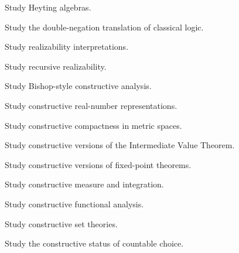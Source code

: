 \begin{exercise}[4]
Study Heyting algebras.
\end{exercise}

\begin{exercise}[4]
Study the double-negation translation of classical logic.
\end{exercise}

\begin{exercise}[4]
Study realizability interpretations.
\end{exercise}

\begin{exercise}[4]
Study recursive realizability.
\end{exercise}

\begin{exercise}[4]
Study Bishop-style constructive analysis.
\end{exercise}

\begin{exercise}[4]
Study constructive real-number representations.
\end{exercise}

\begin{exercise}[4]
Study constructive compactness in metric spaces.
\end{exercise}

\begin{exercise}[4]
Study constructive versions of the Intermediate Value Theorem.
\end{exercise}

\begin{exercise}[4]
Study constructive versions of fixed-point theorems.
\end{exercise}

\begin{exercise}[4]
Study constructive measure and integration.
\end{exercise}

\begin{exercise}[4]
Study constructive functional analysis.
\end{exercise}

\begin{exercise}[4]
Study constructive set theories.
\end{exercise}

\begin{exercise}[4]
Study the constructive status of countable choice.
\end{exercise}

